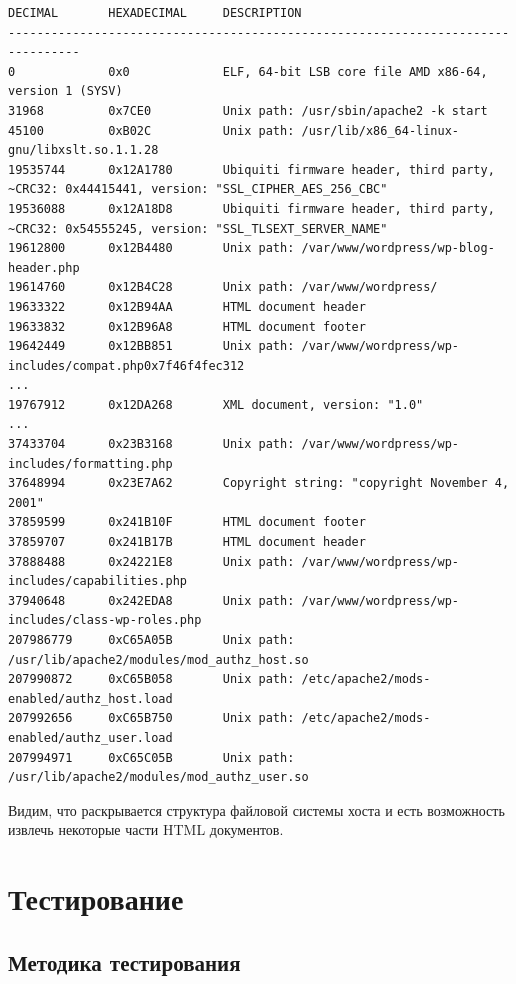 \documentclass[20pt]{article}
\begin{document}
\begin{lstlisting}
DECIMAL       HEXADECIMAL     DESCRIPTION
--------------------------------------------------------------------------------
0             0x0             ELF, 64-bit LSB core file AMD x86-64, version 1 (SYSV)
31968         0x7CE0          Unix path: /usr/sbin/apache2 -k start
45100         0xB02C          Unix path: /usr/lib/x86_64-linux-gnu/libxslt.so.1.1.28
19535744      0x12A1780       Ubiquiti firmware header, third party, ~CRC32: 0x44415441, version: "SSL_CIPHER_AES_256_CBC"
19536088      0x12A18D8       Ubiquiti firmware header, third party, ~CRC32: 0x54555245, version: "SSL_TLSEXT_SERVER_NAME"
19612800      0x12B4480       Unix path: /var/www/wordpress/wp-blog-header.php
19614760      0x12B4C28       Unix path: /var/www/wordpress/
19633322      0x12B94AA       HTML document header
19633832      0x12B96A8       HTML document footer
19642449      0x12BB851       Unix path: /var/www/wordpress/wp-includes/compat.php0x7f46f4fec312
...
19767912      0x12DA268       XML document, version: "1.0"
...
37433704      0x23B3168       Unix path: /var/www/wordpress/wp-includes/formatting.php
37648994      0x23E7A62       Copyright string: "copyright November 4, 2001"
37859599      0x241B10F       HTML document footer
37859707      0x241B17B       HTML document header
37888488      0x24221E8       Unix path: /var/www/wordpress/wp-includes/capabilities.php
37940648      0x242EDA8       Unix path: /var/www/wordpress/wp-includes/class-wp-roles.php
207986779     0xC65A05B       Unix path: /usr/lib/apache2/modules/mod_authz_host.so
207990872     0xC65B058       Unix path: /etc/apache2/mods-enabled/authz_host.load
207992656     0xC65B750       Unix path: /etc/apache2/mods-enabled/authz_user.load
207994971     0xC65C05B       Unix path: /usr/lib/apache2/modules/mod_authz_user.so
\end{lstlisting}

Видим, что раскрывается структура файловой системы хоста и есть возможность извлечь
некоторые части HTML документов.

\newpage

\section{Тестирование}

\subsection{Методика тестирования}
\end{document}
